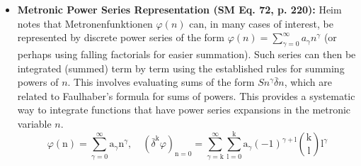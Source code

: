 \documentclass[12pt]{article}
\newcommand{\metronintegral}{S}
\newcommand{\metronenziffer}{n}
\begin{document}
\begin{itemize}
\begin{itemize}
        \item \textbf{Metronic Quotient Integration (SM Eq. 71a)}: Heim provides the integral counterpart to the discrete quotient differential rule, demonstrating how ratios of functions accumulate across the lattice:
        \begin{equation}
        \mathrm{S}\frac{\varphi}{\psi}\bar{\delta}\mathrm{n} = \frac{\mathrm{u}}{\mathrm{v}}, \quad \text{where} \quad \frac{\varphi}{\psi} = \frac{\mathrm{v}\bar{\delta}\mathrm{u} - \mathrm{u}\bar{\delta}\mathrm{v}}{\mathrm{v}(\mathrm{n})\mathrm{v}(\mathrm{n}-1)} \tag{71a}
        \end{equation}
    \end{itemize}

    \item \textbf{Metronic Power Series Representation (SM Eq. 72, p. 220):}
    Heim notes that Metronenfunktionen \( \varphi(\metronenziffer) \) can, in many cases of interest, be represented by discrete power series of the form \( \varphi(\metronenziffer) = \sum_{\gamma=0}^{\infty} a_{\gamma} \metronenziffer^{\gamma} \) (or perhaps using falling factorials for easier summation). Such series can then be integrated (summed) term by term using the established rules for summing powers of \( \metronenziffer \). This involves evaluating sums of the form \( \metronintegral \metronenziffer^{\gamma} \bar{\delta}\metronenziffer \), which are related to Faulhaber's formula for sums of powers. This provides a systematic way to integrate functions that have power series expansions in the metronic variable \( \metronenziffer \).
    \begin{equation}
    \varphi(\mathrm{n}) = \sum_{\gamma=0}^\infty \mathrm{a}_\gamma \mathrm{n}^\gamma, \quad (\bar{\delta}^\mathrm{k} \varphi)_{\mathrm{n}=0} = \sum_{\gamma=\mathrm{k}}^\infty \sum_{\mathrm{l}=0}^\mathrm{k} \mathrm{a}_\gamma (-1)^{\gamma+\mathrm{l}} \binom{\mathrm{k}}{\mathrm{l}} \mathrm{l}^\gamma \tag{72}
    \end{equation}


\end{itemize}
\end{document}
